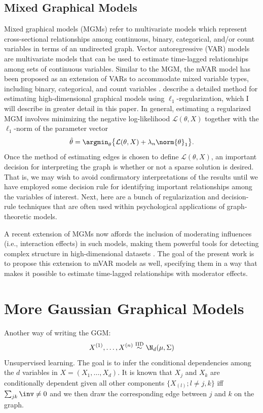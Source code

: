 \subsection{Mixed Graphical Models}
Mixed graphical models (MGMs) refer to multivariate models which represent cross-sectional relationships among continuous, binary, categorical, and/or count variables in terms of an undirected graph. Vector autoregressive (VAR) models are multivariate models that can be used to estimate time-lagged relationships among sets of continuous variables. Similar to the MGM, the mVAR model has been proposed as an extension of VARs to accommodate mixed variable types, including binary, categorical, and count variables \cite{haslbeck2015mgm}. \cite{wainwright2007high} describe a detailed method for estimating high-dimensional graphical models using $\ell_1$-regularization, which I will describe in greater detail in this paper. In general, estimating a regularized MGM involves minimizing the negative log-likelihood $\mathcal{L}(\theta, X)$ together with the $\ell_1$-norm of the parameter vector
\begin{equation} \label{loss}
    \hat{\theta} = \argmin_{\theta} \big\{ \mathcal{L}(\theta, X) + \lambda_n \norm{\theta}_1 \big\}.
\end{equation}
Once the method of estimating edges is chosen to define $\mathcal{L}(\theta, X)$, an important decision for interpreting the graph is whether or not a sparse solution is desired. That is, we may wish to avoid confirmatory interpretations of the results until we have employed some decision rule for identifying important relationships among the variables of interest. Next, here are a bunch of regularization and decision-rule techniques that are often used within psychological applications of graph-theoretic models.

A recent extension of MGMs now affords the inclusion of moderating influences (i.e., interaction effects) in such models, making them powerful tools for detecting complex structure in high-dimensional datasets \cite{haslbeck2018moderated}. The goal of the present work is to propose this extension to mVAR models as well, specifying them in a way that makes it possible to estimate time-lagged relationships with moderator effects.

\section{More Gaussian Graphical Models}
Another way of writing the GGM:
\begin{equation}
    X^{(1)},\ldots,X^{(n)} \overset{\text{IID}}{\sim} \N_d (\mu,\Sigma)
\end{equation}
Unsupervised learning. The goal is to infer the conditional dependencies among the $d$ variables in $X = (X_1,\ldots,X_d)$. It is known that $X_j$ and $X_k$ are conditionally dependent given all other components $\{X_{(l)};l\neq j,k\}$ iff $\sum_{jk}\inv \neq 0$ and we then draw the corresponding edge between $j$ and $k$ on the graph.